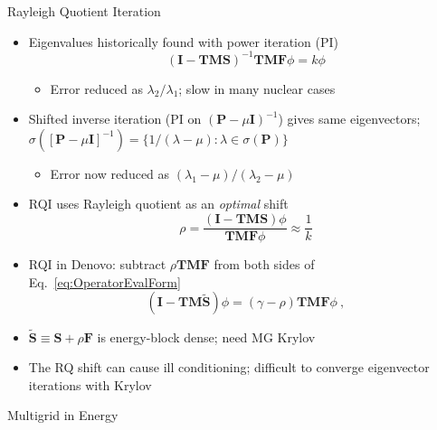 \documentclass[final]{beamer}
\newcommand{\ve}[1]{\ensuremath{\mathbf{#1}}}
\begin{document}
\begin{frame}{}
\begin{columns}[t]
    \begin{column}{.3\linewidth}
    \begin{block}{Rayleigh Quotient Iteration \cite{Slaybaugh2012}}
	\begin{itemize}
	\item{Eigenvalues historically found with power iteration (PI)}
	\begin{equation}
	(\ve{I} - \ve{TMS})^{-1} \ve{TMF} \phi = k\phi
	\end{equation}
	\vspace*{-1em}
		\begin{itemize}
		\item{Error reduced as $\lambda_{2}/\lambda_{1}$; slow in many nuclear cases}
		\end{itemize}
		\vspace*{0.2 em}
	\item{Shifted inverse iteration (PI on $(\ve{P} - \mu \ve{I})^{-1}$) gives same eigenvectors; $\sigma([\ve{P} - \mu \ve{I}]^{-1}) = \{1/(\lambda - \mu):\lambda \in \sigma(\ve{P})\}$ }
		\vspace*{0.1 em}
		\begin{itemize}
		\item{Error now reduced as $(\lambda_{1}-\mu)/(\lambda_{2}-\mu)$}
		\end{itemize}		
		\vspace*{0.1 em}
	\item{RQI uses Rayleigh quotient as an \textit{optimal} shift}
		\begin{equation}
          \rho = \frac{(\ve{I} - \ve{TMS})\phi}{\ve{TMF} \phi} \approx \frac{1}{k}
		\end{equation}
		\item{RQI in Denovo: subtract $\rho \ve{TMF}$ from both sides of 
		 Eq.\ \eqref{eq:OperatorEvalForm}}
        \begin{equation}
          (\ve{I} - \ve{TM}\ve{\tilde{S}})\phi =( \gamma - \rho) \ve{TMF} \phi  \:, 
          \label{eq:OperatorShiftedEval} 
        \end{equation}
		\item{$\ve{\tilde{S}} \equiv \ve{S} + \rho\ve{F}$ is energy-block dense;
		 need MG Krylov}
		\item{The RQ shift can cause ill conditioning; difficult to converge
		 eigenvector iterations with Krylov}
	\end{itemize}
            \end{block}
		\vfill
        	\begin{block}{\large Multigrid in Energy \cite{Slaybaugh2013}}

\end{block}
\end{column}
\end{columns}
\end{frame}
\end{document}
